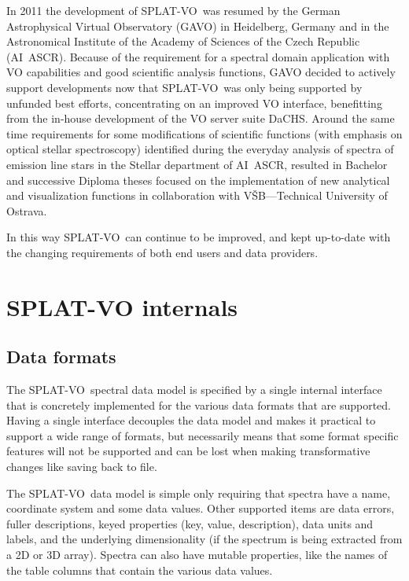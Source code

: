 \documentclass[final,authoryear,5p,times,twocolumn]{elsarticle}
\newcommand{\splatvo}{{\textsf{\small{SPLAT-VO}}}}
\newcommand{\dachs}{\textsf{\small DaCHS}}
\begin{document}
In 2011 the development of  \splatvo\ was resumed by the German Astrophysical
Virtual Observatory (GAVO) in Heidelberg, Germany and in  the Astronomical
Institute of the Academy of Sciences of the Czech Republic (AI~ASCR).  Because
of the requirement for a spectral domain application with VO capabilities and
good scientific analysis functions, GAVO  decided to actively support
developments now that \splatvo\ was only being supported by unfunded best
efforts, concentrating on an improved VO interface, benefitting from the
in-house development of the VO server suite \dachs.  Around the same time
requirements for some modifications of scientific functions (with emphasis on
optical stellar spectroscopy) identified during the everyday analysis of
spectra of emission line stars in the Stellar department of AI~ASCR, resulted
in Bachelor and successive Diploma theses focused on the implementation of new
analytical and visualization functions in collaboration with
V\v{S}B---Technical University of Ostrava.

In this way \splatvo\ can continue to be improved, and kept up-to-date with the
changing requirements of both end users and data providers.


\section{SPLAT-VO internals}

\subsection{Data formats}

The \splatvo\ spectral data model is specified by a single internal interface
that is concretely implemented for the various data formats that are
supported. Having a single interface decouples the data model and makes it
practical to support a wide range of formats, but necessarily means that some
format specific features will not be supported and can be lost when making
transformative changes like saving back to file.

The \splatvo\ data model is simple only requiring that spectra have a name,
coordinate system and some data values. Other supported items are data errors,
fuller descriptions, keyed properties (key, value, description), data units
and labels, and the underlying dimensionality (if the spectrum is being
extracted from a 2D or 3D array). Spectra can also have mutable properties,
like the names of the table columns that contain the various data values.
\end{document}
